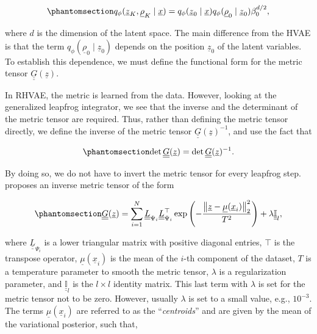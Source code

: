 \documentclass[
]{scrartcl}
\begin{document}
\begin{refsection}
\begin{equation}\phantomsection\label{eq-rhvae-variational-distribution-expanded}{
q_{\phi}(\underline{z}_K, \underline{\rho}_K \mid \underline{x}) = 
q_{\phi}(\underline{z}_0 \mid \underline{x}) 
q_{\phi}(\underline{\rho}_0 \mid \underline{z}_0) 
\beta_0^{d / 2},
}\end{equation}

where \(d\) is the dimension of the latent space. The main difference
from the HVAE is that the term
\(q_{\phi}(\underline{\rho}_0 \mid \underline{z}_0)\) depends on the
position \(\underline{z}_0\) of the latent variables. To establish this
dependence, we must define the functional form for the metric tensor
\(\underline{\underline{G}}(\underline{z})\).

In RHVAE, the metric is learned from the data. However, looking at the
generalized leapfrog integrator, we see that the inverse and the
determinant of the metric tensor are required. Thus, rather than
defining the metric tensor directly, we define the inverse of the metric
tensor \(\underline{\underline{G}}(\underline{z})^{-1}\), and use the
fact that

\begin{equation}\phantomsection\label{eq-metric-determinant-equivalence}{
\det \underline{\underline{G}}(\underline{z}) = 
\det \underline{\underline{G}}(\underline{z})^{-1}.
}\end{equation}

By doing so, we do not have to invert the metric tensor for every
leapfrog step. \textcite{chadebec2020} proposes an inverse metric tensor
of the form

\begin{equation}\phantomsection\label{eq-metric-tensor-rhvae}{
\underline{\underline{G}}(\underline{z}) =
\sum_{i=1}^N 
\underline{\underline{L}}_{\Psi_i} 
\underline{\underline{L}}_{\Psi_i}^{\top} 
\exp \left(
    -\frac{
        \left\| \underline{z} - \underline{\mu}{(\underline{x}_i)} \right\|_2^2
        }{
            T^2
        } 
    \right) + 
\lambda \underline{\underline{\mathbb{I}}}_l,
}\end{equation}

where \(\underline{\underline{L}}_{\Psi_i}\) is a lower triangular
matrix with positive diagonal entries, \(\top\) is the transpose
operator, \(\underline{\mu}(\underline{x}_i)\) is the mean of the
\(i\)-th component of the dataset, \(T\) is a temperature parameter to
smooth the metric tensor, \(\lambda\) is a regularization parameter, and
\(\underline{\underline{\mathbb{I}}}_l\) is the \(l \times l\) identity
matrix. This last term with \(\lambda\) is set for the metric tensor not
to be zero. However, usually \(\lambda\) is set to a small value, e.g.,
\(10^{-3}\). The terms \(\underline{\mu}{(\underline{x}_i)}\) are
referred to as the ``\emph{centroids}'' and are given by the mean of the
variational posterior, such that,


\end{refsection}
\end{document}

